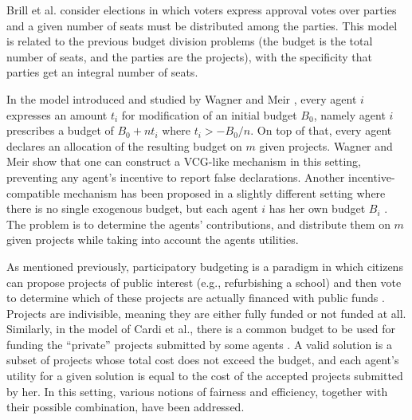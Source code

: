 \documentclass{article}
\begin{document}
Brill et al. \cite{BGPSW24} consider elections in which voters express approval votes over parties and a given number of seats must be distributed among the parties. This model is related to the previous budget division problems (the budget is the total number of seats, and the parties are the projects), with the specificity that parties get an integral number of seats. 





In the model introduced and studied by Wagner and Meir \cite{WagnerM23}, every agent $i$ expresses an amount $t_i$ for modification of an initial budget $B_0$, namely agent $i$ prescribes a budget of $B_0+n t_i$ where $t_i >-B_0/n$. On top of that, every agent declares an allocation of the resulting budget on $m$ given projects. Wagner and Meir show that one can construct a VCG-like mechanism in this setting, preventing any agent's incentive to report false declarations. Another incentive-compatible mechanism has been proposed in a slightly different setting where there is no single exogenous budget, but each agent $i$ has her own budget $B_i$ \cite{BRANDL2022102585}. The problem is to determine the agents’ contributions, and %
distribute them on $m$ given projects while taking into account the agents utilities. 



As mentioned previously, participatory budgeting is a %
paradigm in which citizens can propose projects of public interest (e.g., refurbishing a school) and then vote to determine which of these projects are actually financed with public funds \cite{AS21,de2022international}. Projects are indivisible, meaning they are either fully funded or not funded at all. Similarly, in the model of Cardi et al., there is a common budget to be used for funding the ``private'' projects submitted by some agents  \cite{CGL21,CGL22}. A valid solution is a subset of projects whose total cost does not exceed the budget, and each agent's utility for a given solution is equal to the cost of the accepted projects submitted by her. In this setting, various notions of fairness and efficiency, together with their possible combination, have been addressed. 
\end{document}
